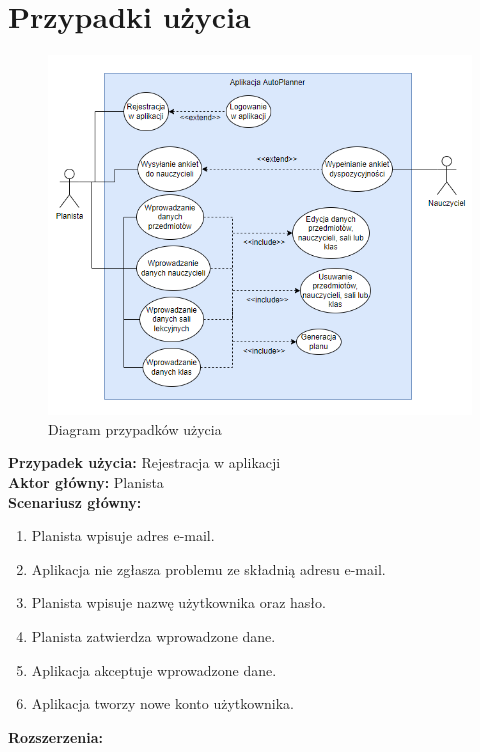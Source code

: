 \section{Przypadki użycia}
\begin{figure}[!ht]
\centering\includegraphics[width=\textwidth]{figures/DiagramPU}
\caption{Diagram przypadków użycia}\label{rys:pu}
\end{figure}
\noindent
\textbf{Przypadek użycia:} Rejestracja w aplikacji\\
\textbf{Aktor główny:} Planista\\
\textbf{Scenariusz główny:}
\begin{enumerate}
	\item Planista wpisuje adres e-mail.
	\item Aplikacja nie zgłasza problemu ze składnią adresu e-mail.
	\item Planista wpisuje nazwę użytkownika oraz hasło.
	\item Planista zatwierdza wprowadzone dane.
	\item Aplikacja akceptuje wprowadzone dane.
	\item Aplikacja tworzy nowe konto użytkownika.
\end{enumerate}
\textbf{Rozszerzenia:}
